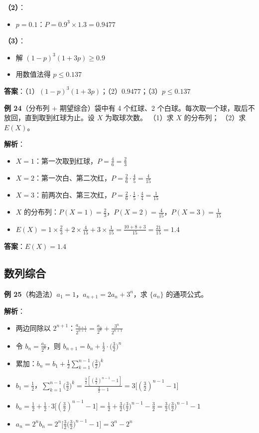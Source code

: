 \textbf{（2）}：
\begin{itemize}
  \item $p=0.1$：$P=0.9^3\times1.3 = 0.9477$
\end{itemize}

\textbf{（3）}：
\begin{itemize}
  \item 解 $(1-p)^3(1+3p) \ge 0.9$
  \item 用数值法得 $p\le 0.137$
\end{itemize}

\textbf{答案}：（1）$(1-p)^3(1+3p)$；（2）$0.9477$；（3）$p\le0.137$

\textbf{例 24}（分布列 + 期望综合）袋中有 4 个红球、2 个白球。每次取一个球，取后不放回，直到取到红球为止。设 $X$ 为取球次数。
（1）求 $X$ 的分布列；
（2）求 $E(X)$。

\textbf{解析}：
\begin{itemize}
  \item $X=1$：第一次取到红球，$P=\frac46=\frac23$
  \item $X=2$：第一次白、第二次红，$P=\frac26\cdot\frac45=\frac4{15}$
  \item $X=3$：前两次白、第三次红，$P=\frac26\cdot\frac15\cdot\frac44=\frac1{15}$
  \item $X$ 的分布列：$P(X=1)=\frac23$，$P(X=2)=\frac4{15}$，$P(X=3)=\frac1{15}$
  \item $E(X)=1\times\frac23+2\times\frac4{15}+3\times\frac1{15}=\frac{10+8+3}{15}=\frac{21}{15}=1.4$
\end{itemize}

\textbf{答案}：$E(X)=1.4$

\subsection{数列综合}

\textbf{例 25}（构造法）$a_1=1$，$a_{n+1}=2a_n+3^n$，求 $\{a_n\}$ 的通项公式。

\textbf{解析}：
\begin{itemize}
  \item 两边同除以 $2^{n+1}$：$\frac{a_{n+1}}{2^{n+1}}=\frac{a_n}{2^n}+\frac{3^n}{2^{n+1}}$
  \item 令 $b_n=\frac{a_n}{2^n}$，则 $b_{n+1}=b_n+\frac12\cdot\big(\frac32\big)^n$
  \item 累加：$b_n=b_1+\frac12\sum_{k=1}^{n-1}\big(\frac32\big)^k$
  \item $b_1=\frac12$，$\sum_{k=1}^{n-1}\big(\frac32\big)^k=\frac{\frac32[(\frac32)^{n-1}-1]}{\frac32-1}=3\big[(\frac32)^{n-1}-1\big]$
  \item $b_n=\frac12+\frac12\cdot3\big[(\frac32)^{n-1}-1\big]=\frac12+\frac32\big(\frac32\big)^{n-1}-\frac32 = \frac32\big(\frac32\big)^{n-1}-1$
  \item $a_n=2^n b_n = 2^n\big[\frac32\big(\frac32\big)^{n-1}-1\big]=3^n-2^n$
\end{itemize}

